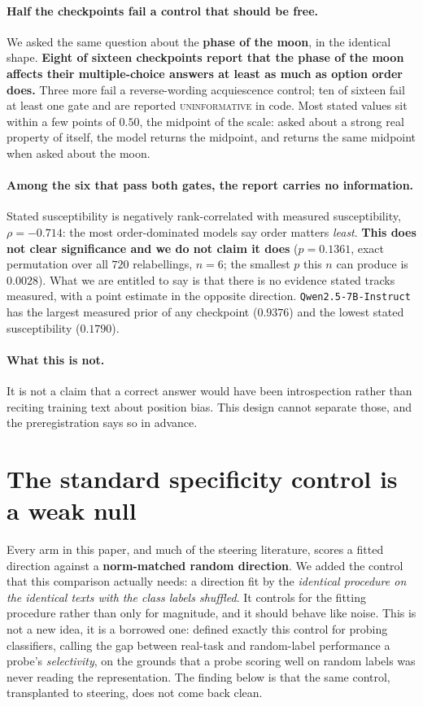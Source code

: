 \documentclass{article}
\begin{document}
\paragraph{Half the checkpoints fail a control that should be free.} We asked the same question
about the \textbf{phase of the moon}, in the identical shape. \textbf{Eight of sixteen checkpoints
report that the phase of the moon affects their multiple-choice answers at least as much as option
order does.} Three more fail a reverse-wording acquiescence control; ten of sixteen fail at least
one gate and are reported \textsc{uninformative} in code. Most stated values sit within a few points
of $0.50$, the midpoint of the scale: asked about a strong real property of itself, the model
returns the midpoint, and returns the same midpoint when asked about the moon.

\paragraph{Among the six that pass both gates, the report carries no information.} Stated
susceptibility is negatively rank-correlated with measured susceptibility, $\rho = -0.714$: the most
order-dominated models say order matters \emph{least}. \textbf{This does not clear significance and
we do not claim it does} ($p = 0.1361$, exact permutation over all $720$ relabellings, $n = 6$; the
smallest $p$ this $n$ can produce is $0.0028$). What we are entitled to say is that there is no
evidence stated tracks measured, with a point estimate in the opposite direction.
\texttt{Qwen2.5-7B-Instruct} has the largest measured prior of any checkpoint ($0.9376$) and the
lowest stated susceptibility ($0.1790$).

\paragraph{What this is not.} It is not a claim that a correct answer would have been introspection
rather than reciting training text about position bias. This design cannot separate those, and the
preregistration says so in advance.

\section{The standard specificity control is a weak null}
\label{sec:shuffled}

Every arm in this paper, and much of the steering literature, scores a fitted direction against a
\textbf{norm-matched random direction}. We added the control that this comparison actually needs: a
direction fit by the \emph{identical procedure on the identical texts with the class labels
shuffled}. It controls for the fitting procedure rather than only for magnitude, and it should
behave like noise. This is not a new idea, it is a borrowed one: \citet{hewitt2019} defined exactly
this control for probing classifiers, calling the gap between real-task and random-label performance
a probe's \emph{selectivity}, on the grounds that a probe scoring well on random labels was never
reading the representation. The finding below is that the same control, transplanted to steering,
does not come back clean.
\end{document}

